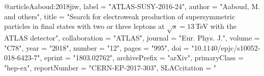@article{Aaboud:2018jiw,
      label          = "ATLAS-SUSY-2016-24",
      author         = "Aaboud, M. and others",
      title          = "{Search for electroweak production of supersymmetric
                        particles in final states with two or three leptons at
                        $\sqrt{s}=13\,$TeV with the ATLAS detector}",
      collaboration  = "ATLAS",
      journal        = "Eur. Phys. J.",
      volume         = "C78",
      year           = "2018",
      number         = "12",
      pages          = "995",
      doi            = "10.1140/epjc/s10052-018-6423-7",
      eprint         = "1803.02762",
      archivePrefix  = "arXiv",
      primaryClass   = "hep-ex",
      reportNumber   = "CERN-EP-2017-303",
      SLACcitation   = "%
}

